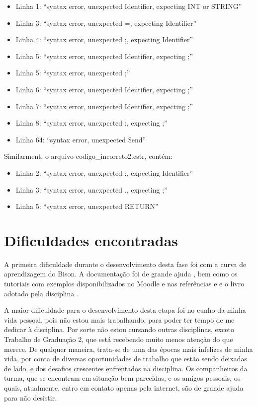 \documentclass[12pt]{article}
\begin{document}
\begin{itemize}
	\item Linha 1: ``syntax error, unexpected Identifier, expecting INT or STRING''
	\item Linha 3: ``syntax error, unexpected =, expecting Identifier''
	\item Linha 4: ``syntax error, unexpected ;, expecting Identifier''
	\item Linha 5: ``syntax error, unexpected Identifier, expecting ;''
	\item Linha 5: ``syntax error, unexpected ;''
	\item Linha 6: ``syntax error, unexpected Identifier, expecting ;''
	\item Linha 7: ``syntax error, unexpected Identifier, expecting ;''
	\item Linha 8: ``syntax error, unexpected :, expecting ;''
	\item Linha 64: ``syntax error, unexpected \$end''\\
\end{itemize}


Similarment, o arquivo codigo\_incorreto2.cstr, contém:

\begin{itemize}
	\item Linha 2: ``syntax error, unexpected ;, expecting Identifier''
	\item Linha 3: ``syntax error, unexpected ., expecting ;''
	\item Linha 5: ``syntax error, unexpected RETURN''\\
\end{itemize}


\section{Dificuldades encontradas}

\indent

A primeira dificuldade durante o desenvolvimento desta fase foi com a curva de aprendizagem do Bison. A documentação foi de grande ajuda \cite{bisonmanual}, bem como os tutoriais com exemplos disponibilizados no Moodle e nas referências \cite{aquamentus} e \cite{lexeyacctutorial} e o livro adotado pela disciplina \cite{compiladores2008}.

A maior dificuldade para o desenvolvimento desta etapa foi no cunho da minha vida pessoal, pois não estou mais trabalhando, para poder ter tempo de me dedicar à disciplina. Por sorte não estou cursando outras disciplinas, exceto Trabalho de Graduação 2, que está recebendo muito menos atenção do que merece. De qualquer maneira, trata-se de uma das épocas mais infelizes de minha vida, por conta de diversas oportunidades de trabalho que estão sendo deixadas de lado, e dos desafios crescentes enfrentados na disciplina. Os companheiros da turma, que se encontram em situação bem parecidas, e os amigos pessoais, os quais, atualmente, entro em contato apenas pela internet, são de grande ajuda para não desistir.
\end{document}
